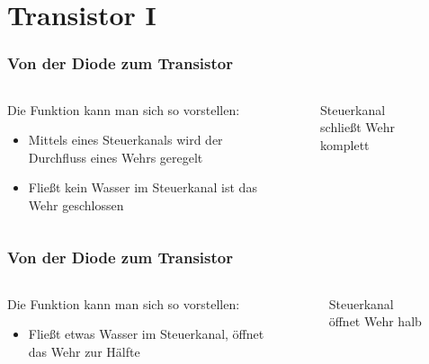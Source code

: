 
\section{Transistor I}
\label{section:transistor_1}
\begin{frame}%

\frametitle{Von der Diode zum Transistor}
\begin{columns}
    \begin{column}{0.48\textwidth}
    Die Funktion kann man sich so vorstellen:

\begin{itemize}
  \item Mittels eines Steuerkanals wird der Durchfluss eines Wehrs geregelt
  \item Fließt kein Wasser im Steuerkanal ist das Wehr geschlossen
  \end{itemize}

    \end{column}
   \begin{column}{0.48\textwidth}
       
\begin{figure}
    \caption{\scriptsize Steuerkanal schließt Wehr komplett}
    \label{e_transistor_wehr_geschlossen}
\end{figure}


   \end{column}
\end{columns}

\end{frame}

\begin{frame}
\frametitle{Von der Diode zum Transistor}
\begin{columns}
    \begin{column}{0.48\textwidth}
    Die Funktion kann man sich so vorstellen:

\begin{itemize}
  \item Fließt etwas Wasser im Steuerkanal, öffnet das Wehr zur Hälfte
  \end{itemize}

    \end{column}
   \begin{column}{0.48\textwidth}
       
\begin{figure}
    \caption{\scriptsize Steuerkanal öffnet Wehr halb}
    \label{e_transistor_wehr_halb_offen}
\end{figure}


   \end{column}
\end{columns}

\end{frame}

